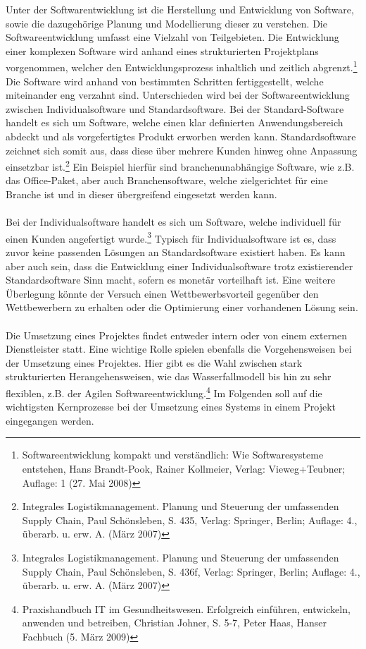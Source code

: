 Unter der Softwarentwicklung ist die Herstellung und Entwicklung von Software, sowie die dazugehörige Planung und Modellierung dieser zu verstehen.
Die Softwareentwicklung umfasst eine Vielzahl von Teilgebieten.
Die Entwicklung einer komplexen Software wird anhand eines strukturierten Projektplans vorgenommen, welcher den Entwicklungsprozess inhaltlich und zeitlich abgrenzt.\footnote{Softwareentwicklung kompakt und verständlich: Wie Softwaresysteme entstehen, Hans Brandt-Pook, Rainer Kollmeier, Verlag: Vieweg+Teubner; Auflage: 1 (27. Mai 2008)}
Die Software wird anhand von bestimmten Schritten fertiggestellt, welche miteinander eng verzahnt sind.
Unterschieden wird bei der Softwareentwicklung zwischen Individualsoftware und Standardsoftware.
Bei der Standard-Software handelt es sich um Software, welche einen klar definierten Anwendungsbereich abdeckt und als vorgefertigtes Produkt erworben werden kann.
Standardsoftware zeichnet sich somit aus, dass diese über mehrere Kunden hinweg ohne Anpassung einsetzbar ist.\footnote{Integrales Logistikmanagement. Planung und Steuerung der umfassenden Supply Chain, Paul Schönsleben, S. 435, Verlag: Springer, Berlin; Auflage: 4., überarb. u. erw. A. (März 2007)}
Ein Beispiel hierfür sind branchenunabhängige Software, wie z.B. das Office-Paket, aber auch Branchensoftware, welche zielgerichtet für eine Branche ist und in dieser übergreifend eingesetzt werden kann.\\\\
Bei der Individualsoftware handelt es sich um Software, welche individuell für einen Kunden angefertigt wurde.\footnote{Integrales Logistikmanagement. Planung und Steuerung der umfassenden Supply Chain, Paul Schönsleben, S. 436f, Verlag: Springer, Berlin; Auflage: 4., überarb. u. erw. A. (März 2007)}
Typisch für Individualsoftware ist es, dass zuvor keine passenden Lösungen an Standardsoftware existiert haben. 
Es kann aber auch sein, dass die Entwicklung einer Individualsoftware trotz existierender Standardsoftware Sinn macht, sofern es monetär vorteilhaft ist.
Eine weitere Überlegung könnte der Versuch einen Wettbewerbsvorteil gegenüber den Wettbewerbern zu erhalten oder die Optimierung einer vorhandenen Lösung sein.\\\\
Die Umsetzung eines Projektes findet entweder intern oder von einem externen Dienstleister statt.
Eine wichtige Rolle spielen ebenfalls die Vorgehensweisen bei der Umsetzung eines Projektes.
Hier gibt es die Wahl zwischen stark strukturierten Herangehensweisen, wie das Wasserfallmodell bis hin zu sehr flexiblen, z.B. der Agilen Softwareentwicklung.\footnote{Praxishandbuch IT im Gesundheitswesen. Erfolgreich einführen, entwickeln, anwenden und betreiben, Christian Johner, S. 5-7, Peter Haas, Hanser Fachbuch (5. März 2009)}
Im Folgenden soll auf die wichtigsten Kernprozesse bei der Umsetzung eines Systems in einem Projekt eingegangen werden.\\

